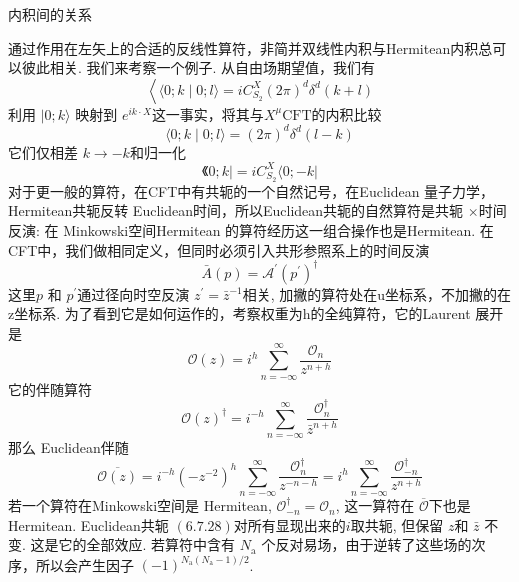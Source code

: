 \centerline{\Large 内积间的关系}
通过作用在左矢上的合适的反线性算符，非简并双线性内积与Hermitean内积总可以彼此相关. 我们来考察一个例子. 从自由场期望值，我们有
\begin{equation}
	\left\langle\langle 0 ; k \mid 0 ; l\rangle=i C_{S_{2}}^{X}(2 \pi)^{d} \delta^{d}(k+l)\right.
\end{equation}
利用 $|0 ; k\rangle$ 映射到 $e^{i k \cdot X}$这一事实，将其与$X^{\mu} \mathrm{CFT}$的内积比较
\begin{equation}
	\langle 0 ; k \mid 0 ; l\rangle=(2 \pi)^{d} \delta^{d}(l-k)
\end{equation}
它们仅相差 $k \rightarrow-k$和归一化
\begin{equation}
	《 0 ; k \mid=i C_{S_{2}}^{X}\langle 0 ;-k|
\end{equation}
对于更一般的算符，在CFT中有共轭的一个自然记号，在Euclidean 量子力学， Hermitean共轭反转 Euclidean时间，所以Euclidean共轭的自然算符是共轭 $\times$时间反演: 在 Minkowski空间Hermitean 的算符经历这一组合操作也是Hermitean. 在CFT中，我们做相同定义，但同时必须引入共形参照系上的时间反演
\begin{equation}
	\bar{A}(p)=\mathscr{A}^{\prime}\left(p^{\prime}\right)^{\dagger}
\end{equation}
这里$p$ 和 $p^{\prime}$通过径向时空反演 $z^{\prime}=\bar{z}^{-1}$相关, 加撇的算符处在u坐标系，不加撇的在z坐标系. 为了看到它是如何运作的，考察权重为h的全纯算符，它的Laurent 展开是
\begin{equation}
	\mathcal{O}(z)=i^{h} \sum_{n=-\infty}^{\infty} \frac{\mathcal{O}_{n}}{z^{n+h}}
\end{equation}
它的伴随算符
\begin{equation}
	\mathcal{O}(z)^{\dagger}=i^{-h} \sum_{n=-\infty}^{\infty} \frac{\mathcal{O}_{n}^{\dagger}}{\bar{z}^{n+h}}
\end{equation}
那么 Euclidean伴随
\begin{equation}
	\overline{\mathcal{O}(z)}=i^{-h}\left(-z^{-2}\right)^{h} \sum_{n=-\infty}^{\infty} \frac{\mathcal{O}_{n}^{\dagger}}{z^{-n-h}}=i^{h} \sum_{n=-\infty}^{\infty} \frac{\mathcal{O}_{-n}^{\dagger}}{z^{n+h}}
\end{equation}
若一个算符在Minkowski空间是 Hermitean, $\mathcal{O}_{-n}^{\dagger}=\mathcal{O}_{n}$, 这一算符在  $\overline{\mathcal{O}}$下也是Hermitean.  Euclidean共轭 $(6.7 .28)$对所有显现出来的$i$取共轭, 但保留 $z$和 $\bar{z}$ 不变. 这是它的全部效应. 若算符中含有 $N_{\mathrm{a}}$ 个反对易场，由于逆转了这些场的次序，所以会产生因子 $(-1)^{N_{\mathrm{a}}\left(N_{\mathrm{a}}-1\right) / 2}$.\\
